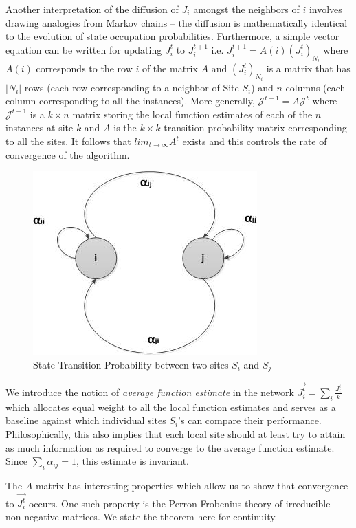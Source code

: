 Another interpretation of the diffusion of $J_i$ amongst the neighbors of $i$ involves drawing analogies from Markov chains -- the diffusion is mathematically identical to the evolution of state occupation probabilities. Furthermore, a simple vector equation can be written for updating $J_i^t$ to $J_i^{t+1}$ i.e. $J_i^{t+1} = A(i) (J_i^t)_{N_i}$ where $A(i)$ corresponds to the row $i$ of the matrix $A$ and $(J_i^t)_{N_i}$ is a matrix that has $|N_i|$ rows (each row corresponding to a neighbor of Site $S_i$) and $n$ columns (each column corresponding to all the instances). More generally, $\mathcal{J}^{t+1} = A \mathcal{J}^{t}$ where $\mathcal{J}^{t+1}$ is a $k \times n$ matrix storing the local function estimates of each of the $n$ instances at site $k$ and $A$ is the $k \times k$ transition probability matrix corresponding to all the sites. It follows that $lim_{t \rightarrow \infty} A^t$ exists and this controls the rate of convergence of the algorithm. 

\begin{figure}[t]
\centerline{\includegraphics[height=0.28\textheight]{stateTrans.jpg}}
\caption{State Transition Probability between two sites $S_i$ and $S_j$}
\label{stateTrans}
\end{figure}

We introduce the notion of \emph{average function estimate} in the network $\vec{J_i^t} = \sum_i \frac{J_i^t}{k}$ which allocates equal weight to all the local function estimates and serves as a baseline against which individual sites $S_i$'s can compare their performance. Philosophically, this also implies that each local site should at least try to attain as much information as required to converge to the average function estimate. Since $\sum_i{\alpha_{ij}}=1$, this estimate is invariant. 

The $A$ matrix has interesting properties which allow us to show that convergence to $\vec{J_i^t}$ occurs. One such property is the Perron-Frobenius theory of irreducible non-negative matrices. We state the theorem here for continuity.

